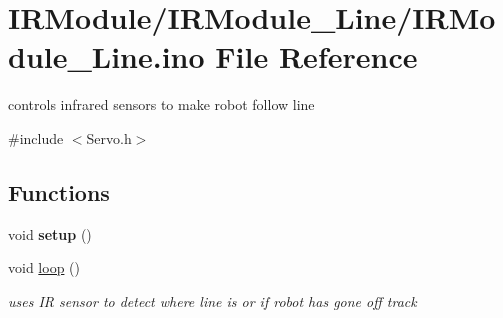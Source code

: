\hypertarget{IRModule__Line_8ino}{}\section{I\+R\+Module/\+I\+R\+Module\+\_\+\+Line/\+I\+R\+Module\+\_\+\+Line.ino File Reference}
\label{IRModule__Line_8ino}


controls infrared sensors to make robot follow line  


{\ttfamily \#include $<$Servo.\+h$>$}\newline
\subsection*{Functions}
\begin{DoxyCompactItemize}
\item 
\mbox{\label{IRModule__Line_8ino_a4fc01d736fe50cf5b977f755b675f11d}} 
void {\bfseries setup} ()
\item 
void \hyperlink{IRModule__Line_8ino_afe461d27b9c48d5921c00d521181f12f}{loop} ()
\begin{DoxyCompactList}\small\item\em uses IR sensor to detect where line is or if robot has gone off track \end{DoxyCompactList}\end{DoxyCompactItemize}
